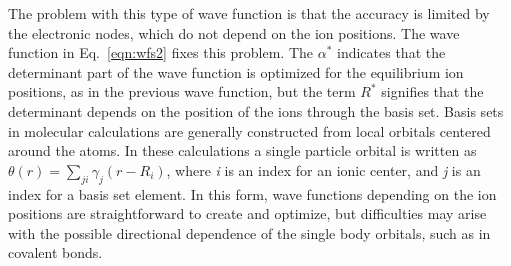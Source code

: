 \documentclass[aip,jcp,numerical,reprint]{revtex4-1}
\begin{document}
The problem with this type of wave function is that the accuracy is limited by the electronic nodes, which do not depend on the ion positions.
The wave function in Eq.~\eqref{eqn:wfs2} fixes this problem.  
The $\alpha^{*}$ indicates that the determinant part of the wave function is optimized for the equilibrium ion positions, as in the previous wave function, but the term $R^{*}$ signifies that the determinant  depends on the position of the ions through the basis set.  Basis sets in molecular calculations are generally constructed from local orbitals centered around the atoms.  In these calculations a single particle orbital is written as $\theta(r) = \sum_{ji}\gamma_{j}(r-R_{i})$, where \textit{i} is an index for an ionic center, and \textit{j} is an index for a basis set element.  
In this form, wave functions depending on the ion positions are straightforward to create and optimize,
but difficulties may arise with the possible directional dependence of the single body orbitals, such as in covalent bonds. %
\end{document}
